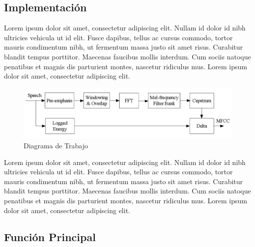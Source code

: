 \documentclass[a4paper,10pt]{article}
\begin{document}
\subsection{Implementación}
Lorem ipsum dolor sit amet, consectetur adipiscing elit. Nullam id dolor id nibh ultricies vehicula ut id elit. Fusce dapibus, tellus ac cursus commodo, tortor mauris condimentum nibh, ut fermentum massa justo sit amet risus. Curabitur blandit tempus porttitor. Maecenas faucibus mollis interdum. Cum sociis natoque penatibus et magnis dis parturient montes, nascetur ridiculus mus. Lorem ipsum dolor sit amet, consectetur adipiscing elit.
\newline

\begin{figure}[h]
\centering
\includegraphics[width=\textwidth]{diagram}
\caption{Diagrama de Trabajo}
\end{figure}

Lorem ipsum dolor sit amet, consectetur adipiscing elit. Nullam id dolor id nibh ultricies vehicula ut id elit. Fusce dapibus, tellus ac cursus commodo, tortor mauris condimentum nibh, ut fermentum massa justo sit amet risus. Curabitur blandit tempus porttitor. Maecenas faucibus mollis interdum. Cum sociis natoque penatibus et magnis dis parturient montes, nascetur ridiculus mus. Lorem ipsum dolor sit amet, consectetur adipiscing elit.

\subsection{Función Principal}
\end{document}
